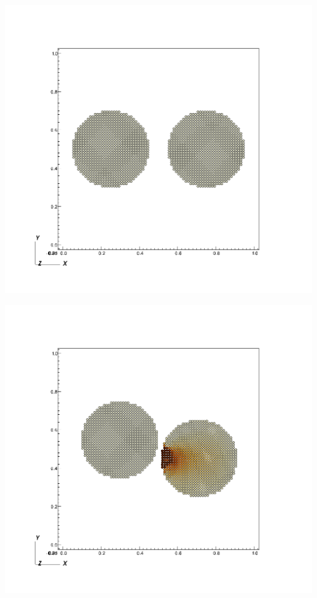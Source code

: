 \begin{minipage}[t]{0.3\textwidth}
  \centering
  \includegraphics[width=0.9\columnwidth]{FIGS/contact/specified0.png}
\end{minipage}
\begin{minipage}[t]{0.3\textwidth}
  \centering
  \includegraphics[width=0.9\columnwidth]{FIGS/contact/specified1.png}
\end{minipage}
